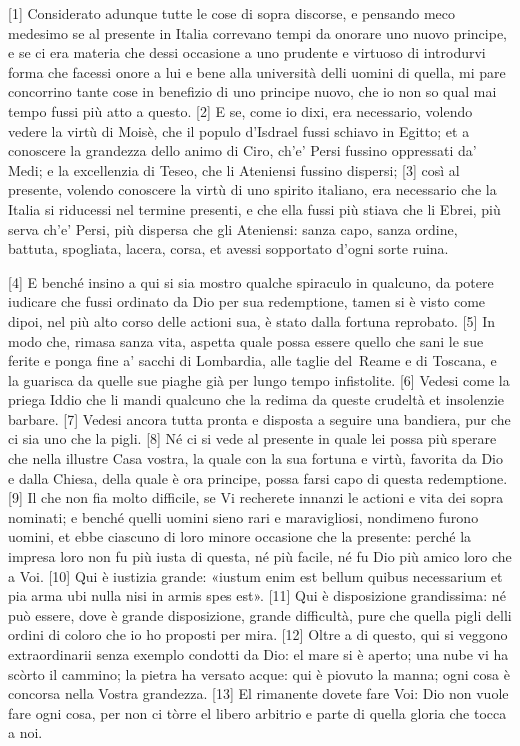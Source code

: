 {[}1{]} Considerato adunque tutte le cose di sopra discorse, e pensando meco medesimo se al presente in Italia correvano tempi da onorare uno nuovo principe, e se ci era materia che dessi occasione a uno prudente e virtuoso di introdurvi forma che facessi onore a lui e bene alla università delli uomini di quella, mi pare concorrino tante cose in benefizio di uno principe nuovo, che io non so qual mai tempo fussi più atto a questo. {[}2{]} E se, come io dixi, era necessario, volendo vedere la virtù di Moisè, che il populo d'Isdrael fussi schiavo in Egitto; et a conoscere la grandezza dello animo di Ciro, ch'e' Persi fussino oppressati da' Medi; e la excellenzia di Teseo, che li Ateniensi fussino dispersi; {[}3{]} così al presente, volendo conoscere la virtù di uno spirito italiano, era necessario che la Italia si riducessi nel termine presenti, e che ella fussi più stiava che li Ebrei, più serva ch'e' Persi, più dispersa che gli Ateniensi: sanza capo, sanza ordine, battuta, spogliata, lacera, corsa, et avessi sopportato d'ogni sorte ruina.

{[}4{]} E benché insino a qui si sia mostro qualche spiraculo in
qualcuno, da potere iudicare che fussi ordinato da Dio per sua
redemptione, tamen si è visto come dipoi, nel più alto corso delle
actioni sua, è stato dalla fortuna reprobato. {[}5{]} In modo che,
rimasa sanza vita, aspetta quale possa essere quello che sani le sue
ferite e ponga fine a' sacchi di Lombardia, alle taglie del\est\ Reame e di
Toscana, e la guarisca da quelle sue piaghe già per lungo tempo
infistolite. {[}6{]} Vedesi come la priega Iddio che li mandi qualcuno
che la redima da queste crudeltà et insolenzie barbare. {[}7{]} Vedesi
ancora tutta pronta e disposta a seguire una bandiera, pur che ci sia
uno che la pigli. {[}8{]} Né ci si vede al presente in quale lei possa
più sperare che nella illustre Casa vostra, la quale con la sua fortuna
e virtù, favorita da Dio e dalla Chiesa, della quale è ora principe,
possa farsi capo di questa redemptione. {[}9{]} Il che non fia molto
difficile, se Vi recherete innanzi le actioni e vita dei sopra nominati;
e benché quelli uomini sieno rari e maravigliosi, nondimeno furono
uomini, et ebbe ciascuno di loro minore occasione che la presente:
perché la impresa loro non fu più iusta di questa, né più facile, né fu
Dio più amico loro che a Voi. {[}10{]} Qui è iustizia grande: «iustum
enim est bellum quibus necessarium et pia arma ubi nulla nisi in armis
spes est». {[}11{]} Qui è disposizione grandissima: né può essere, dove
è grande disposizione, grande difficultà, pure che quella pigli delli
ordini di coloro che io ho proposti per mira. {[}12{]} Oltre a di
questo, qui si veggono extraordinarii senza exemplo condotti da Dio: el
mare si è aperto; una nube vi ha scòrto il cammino; la pietra ha versato
acque: qui è piovuto la manna; ogni cosa è concorsa nella Vostra
grandezza. {[}13{]} El rimanente dovete fare Voi: Dio non vuole fare
ogni cosa, per non ci tòrre el libero arbitrio e parte di quella gloria
che tocca a noi.

